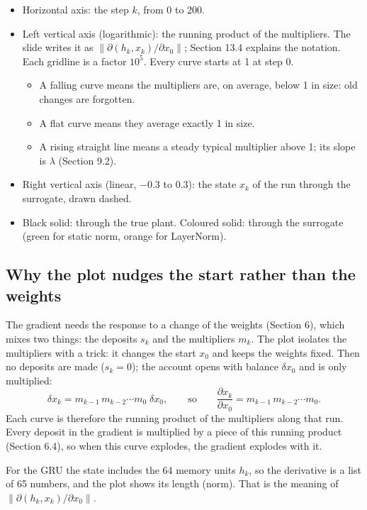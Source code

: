 \documentclass[11pt]{article}
\begin{document}
\begin{itemize}
\item Horizontal axis: the step $k$, from 0 to 200.
\item Left vertical axis (logarithmic): the running product of the multipliers. The slide writes it as $\|\partial(h_k,x_k)/\partial x_0\|$; Section 13.4 explains the notation. Each gridline is a factor $10^5$. Every curve starts at 1 at step 0.
\begin{itemize}
\item A falling curve means the multipliers are, on average, below 1 in size: old changes are forgotten.
\item A flat curve means they average exactly 1 in size.
\item A rising straight line means a steady typical multiplier above 1; its slope is $\lambda$ (Section 9.2).
\end{itemize}
\item Right vertical axis (linear, $-0.3$ to $0.3$): the state $x_k$ of the run through the surrogate, drawn dashed.
\item Black solid: through the true plant. Coloured solid: through the surrogate (green for static norm, orange for LayerNorm).
\end{itemize}

\subsection{Why the plot nudges the start rather than the weights}

The gradient needs the response to a change of the weights (Section 6), which mixes two things: the deposits $s_k$ and the multipliers $m_k$. The plot isolates the multipliers with a trick: it changes the start $x_0$ and keeps the weights fixed. Then no deposits are made ($s_k=0$); the account opens with balance $\delta x_0$ and is only multiplied:
\begin{equation}
\delta x_k=m_{k-1}\,m_{k-2}\cdots m_0\;\delta x_0,\qquad\text{so}\qquad \frac{\partial x_k}{\partial x_0}=m_{k-1}\,m_{k-2}\cdots m_0 .
\end{equation}
Each curve is therefore the running product of the multipliers along that run. Every deposit in the gradient is multiplied by a piece of this running product (Section 6.4), so when this curve explodes, the gradient explodes with it.

For the GRU the state includes the 64 memory units $h_k$, so the derivative is a list of 65 numbers, and the plot shows its length (norm). That is the meaning of $\|\partial(h_k,x_k)/\partial x_0\|$.
\end{document}
